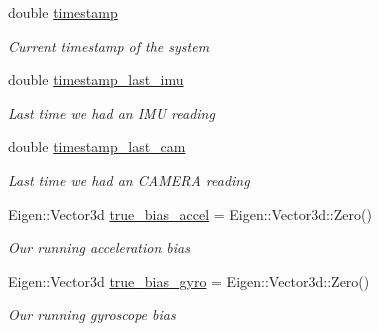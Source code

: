\begin{DoxyCompactItemize}
\mbox{\label{classov__msckf_1_1Simulator_a159c617f73068f44833ed697255e5b86}} 
double \hyperlink{classov__msckf_1_1Simulator_a159c617f73068f44833ed697255e5b86}{timestamp}
\begin{DoxyCompactList}\small\item\em Current timestamp of the system \end{DoxyCompactList}\item 
\mbox{\label{classov__msckf_1_1Simulator_ac7ab83038e9ef893633e4290e5342ac9}} 
double \hyperlink{classov__msckf_1_1Simulator_ac7ab83038e9ef893633e4290e5342ac9}{timestamp\+\_\+last\+\_\+imu}
\begin{DoxyCompactList}\small\item\em Last time we had an I\+MU reading \end{DoxyCompactList}\item 
\mbox{\label{classov__msckf_1_1Simulator_a1e473df4f12ac26610c19bb0d4bc0a67}} 
double \hyperlink{classov__msckf_1_1Simulator_a1e473df4f12ac26610c19bb0d4bc0a67}{timestamp\+\_\+last\+\_\+cam}
\begin{DoxyCompactList}\small\item\em Last time we had an C\+A\+M\+E\+RA reading \end{DoxyCompactList}\item 
\mbox{\label{classov__msckf_1_1Simulator_a9b97c9c0cc01e127bc9f178edd8b12c4}} 
Eigen\+::\+Vector3d \hyperlink{classov__msckf_1_1Simulator_a9b97c9c0cc01e127bc9f178edd8b12c4}{true\+\_\+bias\+\_\+accel} = Eigen\+::\+Vector3d\+::\+Zero()
\begin{DoxyCompactList}\small\item\em Our running acceleration bias \end{DoxyCompactList}\item 
\mbox{\label{classov__msckf_1_1Simulator_a9ca24090484965ea8344a1b1605b963a}} 
Eigen\+::\+Vector3d \hyperlink{classov__msckf_1_1Simulator_a9ca24090484965ea8344a1b1605b963a}{true\+\_\+bias\+\_\+gyro} = Eigen\+::\+Vector3d\+::\+Zero()
\begin{DoxyCompactList}\small\item\em Our running gyroscope bias \end{DoxyCompactList}\item 

\end{DoxyCompactItemize}
